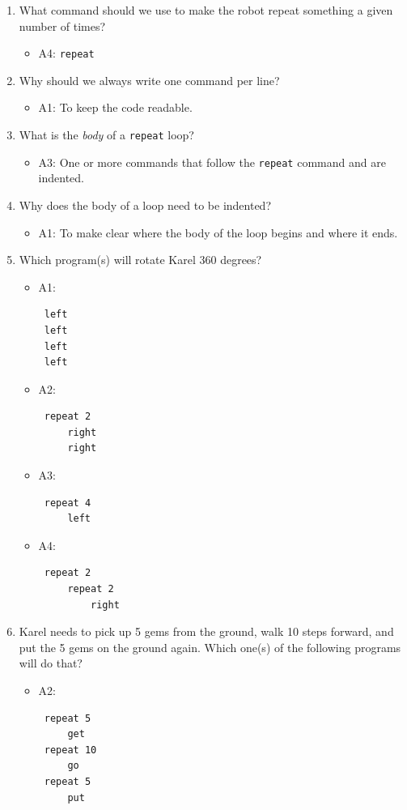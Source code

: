 \documentclass[article,A4,12pt]{llncs}
\begin{document}
\begin{enumerate}
\item What command should we use to make the robot repeat something a given number of times?
  \begin{itemize}
    \item A4: {\tt repeat}
  \end{itemize}
\item Why should we always write one command per line?
  \begin{itemize}
    \item A1: To keep the code readable.
  \end{itemize}
\item What is the {\em body} of a {\tt repeat} loop?
  \begin{itemize}
    \item A3: One or more commands that follow the {\tt repeat} command and are indented.
  \end{itemize}
\item Why does the body of a loop need to be indented?
  \begin{itemize}
    \item A1: To make clear where the body of the loop begins and where it ends.
  \end{itemize}
\item Which program(s) will rotate Karel 360 degrees?
  \begin{itemize}
    \item A1:
\begin{verbatim}
 left
 left
 left
 left
\end{verbatim}
    \item A2:
\begin{verbatim}
 repeat 2
     right
     right
\end{verbatim}
    \item A3:
\begin{verbatim}
 repeat 4
     left
\end{verbatim}
    \item A4:
\begin{verbatim}
 repeat 2
     repeat 2
         right
\end{verbatim}
  \end{itemize}
\item Karel needs to pick up 5 gems from the ground, walk 10 steps forward, and put the 5 gems 
      on the ground again. Which one(s) of the following programs will do that?
  \begin{itemize}
    \item A2:
\begin{verbatim}
 repeat 5
     get
 repeat 10
     go
 repeat 5
     put
\end{verbatim}
  \end{itemize}
\end{enumerate}
\end{document}
